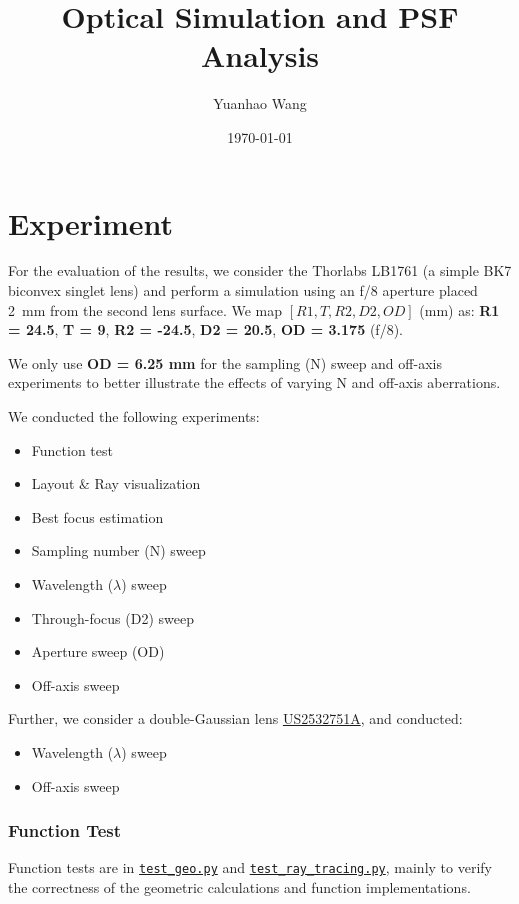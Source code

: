 \documentclass[11pt,a4paper]{article}
\title{Optical Simulation and PSF Analysis}
\author{Yuanhao Wang}
\date{\today}
\begin{document}
	\maketitle
	
	\section{Experiment}\label{experiment}
	
	For the evaluation of the results, we consider the Thorlabs LB1761 (a simple BK7 biconvex singlet lens) and perform a simulation using an f/8 aperture placed \SI{2}{\milli\meter} from the second lens surface.
	We map \([R1, T, R2, D2, OD]\) (mm) as:
	\textbf{R1 = 24.5}, \textbf{T = 9}, \textbf{R2 = -24.5}, \textbf{D2 = 20.5}, \textbf{OD = 3.175} (f/8).
	
	We only use \textbf{OD = 6.25 mm} for the sampling (N) sweep  and off-axis experiments to better illustrate the effects of varying N and off-axis aberrations.
	
	We conducted the following experiments:
	\begin{itemize}
		\item Function test
		\item Layout \& Ray visualization
		\item Best focus estimation
		\item Sampling number (N) sweep
		\item Wavelength (\(\lambda\)) sweep
		\item Through-focus (D2) sweep
		\item Aperture sweep (OD)
		\item Off-axis sweep
	\end{itemize}
	
	Further, we consider a double-Gaussian lens \href{https://patents.google.com/patent/US2532751}{US2532751A}, and conducted:
	\begin{itemize}
		\item Wavelength (\(\lambda\)) sweep
		\item Off-axis sweep
	\end{itemize}
	
	\subsubsection*{Function Test}\label{function-test}
	
	Function tests are in \href{../tests/test_geo.py}{\texttt{test\_geo.py}} and \href{../tests/test_ray_tracing.py}{\texttt{test\_ray\_tracing.py}}, mainly to verify the correctness of the geometric calculations and function implementations.
	
\end{document}
